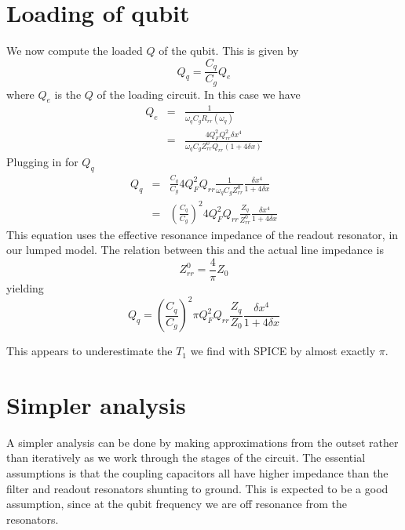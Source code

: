 \documentclass[english,aps,prl]{revtex4}
\begin{document}
\section{Loading of qubit}
We now compute the loaded $Q$ of the qubit. This is given by \begin{equation}
Q_q = \frac{C_q}{C_g} Q_e \end{equation}
where $Q_e$ is the $Q$ of the loading circuit. In this case we have \begin{eqnarray}
Q_e &=& \frac{1}{\omega_q C_g R_{rr}(\omega_q)} \\
&=& \frac{4Q_F^2Q_{rr}^2\delta x^4}{\omega_q C_g Z_{rr}^0 Q_{rr} (1+4\delta x)} \end{eqnarray}
Plugging in for $Q_q$ \begin{eqnarray}
Q_q &=& \frac{C_q}{C_g}4Q_F^2Q_{rr} \frac{1}{\omega_q C_g Z_{rr}^0}\frac{\delta x^4}{1+4\delta x}\\
&=& \left( \frac{C_q}{C_g}\right)^2 4Q_F^2 Q_{rr} \frac{Z_q}{Z_{rr}^0}\frac{\delta x^4}{1+4\delta x} \end{eqnarray}
This equation uses the effective resonance impedance of the readout resonator, in our lumped model. The relation between this and the actual line impedance is \begin{equation}
Z_{rr}^0 = \frac{4}{\pi}Z_0 \end{equation}
yielding \begin{equation}
Q_q = \left( \frac{C_q}{C_g}\right)^2 \pi Q_F^2 Q_{rr} \frac{Z_q}{Z_0}\frac{\delta x^4}{1+4\delta x} \end{equation}

This appears to underestimate the $T_1$ we find with SPICE by almost exactly $\pi$.

\section{Simpler analysis}

A simpler analysis can be done by making approximations from the outset rather than iteratively as we work through the stages of the circuit. The essential assumptions is that the coupling capacitors all have higher impedance than the filter and readout resonators shunting to ground. This is expected to be a good assumption, since at the qubit frequency we are off resonance from the resonators.
\end{document}

